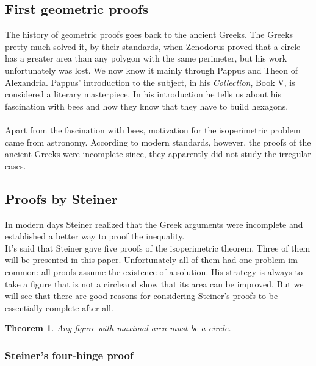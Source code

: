 \documentclass[12pt, a4paper, titlepage]{article}
\newtheorem{thm}{Theorem}
\begin{document}
\subsection{First geometric proofs}
The history of geometric proofs goes back to the ancient Greeks. The Greeks pretty much solved it, by their standards, when Zenodorus proved that a circle has a greater area than any polygon with the same perimeter, but his work unfortunately was lost. We now know it mainly through Pappus and Theon of Alexandria. Pappus' introduction to the subject, in his \textit{Collection}, Book V, is considered a literary masterpiece. In his introduction he tells us about his fascination with bees and how they know that they have to build hexagons.\\\\
Apart from the fascination with bees, motivation for the isoperimetric problem came from astronomy.
According to modern standards, however, the proofs of the ancient Greeks were incomplete since, they apparently did not study the irregular cases. 
\newpage
\subsection{Proofs by Steiner}
In modern days Steiner realized that the Greek arguments were incomplete and established a better way to proof the inequality. \\
It's said that Steiner gave five proofs of the isoperimetric theorem. Three of them will be presented in this paper. Unfortunately all of them had one problem im common: all proofs assume the existence of a solution. His strategy is always to take a figure that is not a circleand show that its area can be improved. But we will see that there are good reasons for considering Steiner's proofs to be essentially complete after all.
\begin{thm}
Any figure with maximal area must be a circle.
\end{thm}
\subsubsection*{Steiner's four-hinge proof}
\end{document}
